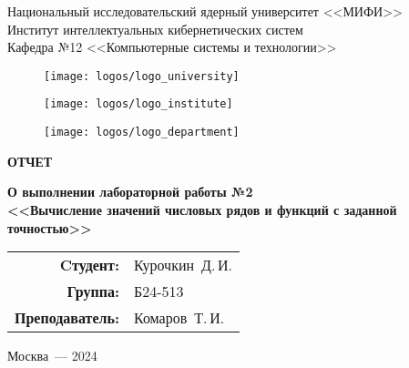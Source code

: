 \begin{titlepage}
  \begin{center}
    \begin{large}
      Национальный исследовательский ядерный университет <<МИФИ>> \\
      \vspace{0.25cm}
      Институт интеллектуальных кибернетических систем \\
      \vspace{0.25cm}
      Кафедра №12 <<Компьютерные системы и технологии>>
    \end{large}

    \vspace*{1cm}

    \begin{figure}[H]
      \centering
      \begin{minipage}[c]{0.3\textwidth}
        \texttt{[image: logos/logo\_university]}
      \end{minipage}
      \hfill
      \begin{minipage}[c]{0.3\textwidth}
        \texttt{[image: logos/logo\_institute]}
      \end{minipage}
      \hfill
      \begin{minipage}[c]{0.3\textwidth}
        \texttt{[image: logos/logo\_department]}
      \end{minipage}
    \end{figure}

    \vspace{4cm}

    \begin{huge}
      \textbf{ОТЧЕТ}
    \end{huge}

    \begin{large}
      \textbf{О выполнении лабораторной работы №2 \\
        <<Вычисление значений
числовых рядов и функций с заданной точностью>>}
    \end{large}

    \vfill

    \begin{flushright}
      \begin{tabular}{ r l }
        \textbf{Cтудент:} & Курочкин~Д.\,И. \\
        \textbf{Группа:} & Б24-513 \\
        \textbf{Преподаватель:} & Комаров~Т.\,И. \\
      \end{tabular}
    \end{flushright}

    Москва~--- 2024
  \end{center}
\end{titlepage}
